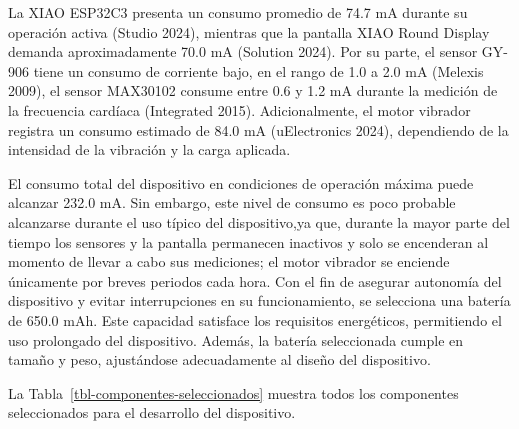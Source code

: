 \documentclass[
  letterpaper,
  DIV=11,
  numbers=noendperiod]{scrreport}
\begin{document}
La XIAO ESP32C3 presenta un consumo promedio de 74.7 mA durante su
operación activa (Studio 2024), mientras que la pantalla XIAO Round
Display demanda aproximadamente 70.0 mA (Solution 2024). Por su parte,
el sensor GY-906 tiene un consumo de corriente bajo, en el rango de 1.0
a 2.0 mA (Melexis 2009), el sensor MAX30102 consume entre 0.6 y 1.2 mA
durante la medición de la frecuencia cardíaca (Integrated 2015).
Adicionalmente, el motor vibrador registra un consumo estimado de 84.0
mA (uElectronics 2024), dependiendo de la intensidad de la vibración y
la carga aplicada.

El consumo total del dispositivo en condiciones de operación máxima
puede alcanzar 232.0 mA. Sin embargo, este nivel de consumo es poco
probable alcanzarse durante el uso típico del dispositivo,ya que,
durante la mayor parte del tiempo los sensores y la pantalla permanecen
inactivos y solo se encenderan al momento de llevar a cabo sus
mediciones; el motor vibrador se enciende únicamente por breves periodos
cada hora. Con el fin de asegurar autonomía del dispositivo y evitar
interrupciones en su funcionamiento, se selecciona una batería de 650.0
mAh. Este capacidad satisface los requisitos energéticos, permitiendo el
uso prolongado del dispositivo. Además, la batería seleccionada cumple
en tamaño y peso, ajustándose adecuadamente al diseño del dispositivo.

La Tabla~\ref{tbl-componentes-seleccionados} muestra todos los
componentes seleccionados para el desarrollo del dispositivo.
\end{document}
